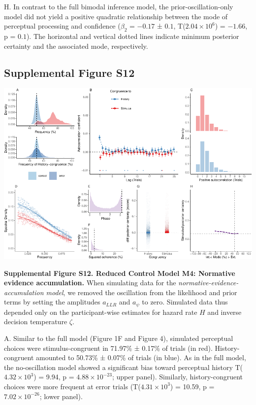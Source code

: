 \documentclass[
]{article}
\begin{document}
H. In contrast to the full bimodal inference model, the
prior-oscillation-only model did not yield a positive quadratic
relationship between the mode of perceptual processing and confidence
(\(\beta_2\) = \(-0.17\) ± \(0.1\),
T(\(\ensuremath{2.04\times 10^{6}}\)) = \(-1.66\), p = \(0.1\)). The
horizontal and vertical dotted lines indicate minimum posterior
certainty and the associated mode, respectively.

\newpage

\hypertarget{supplemental-figure-s12}{%
\subsection{Supplemental Figure S12}\label{supplemental-figure-s12}}

\includegraphics{modes_mouse_rev2_files/figure-latex/Supplemental_Figure_S12-1.pdf}

\textbf{Supplemental Figure S12. Reduced Control Model M4: Normative
evidence accumulation.} When simulating data for the
\emph{normative-evidence-accumulation model}, we removed the oscillation
from the likelihood and prior terms by setting the amplitudes
\(a_{LLR}\) and \(a_{\psi}\) to zero. Simulated data thus depended only
on the participant-wise estimates for hazard rate \(H\) and inverse
decision temperature \(\zeta\).

A. Similar to the full model (Figure 1F and Figure 4), simulated
perceptual choices were stimulus-congruent in 71.97\% ± 0.17\% of trials
(in red). History-congruent amounted to 50.73\% ± 0.07\% of trials (in
blue). As in the full model, the no-oscillation model showed a
significant bias toward perceptual history
T(\ensuremath{4.32\times 10^{3}}) = 9.94, p =
\(\ensuremath{4.88\times 10^{-23}}\); upper panel). Similarly,
history-congruent choices were more frequent at error trials
(T(\ensuremath{4.31\times 10^{3}}) = 10.59, p =
\(\ensuremath{7.02\times 10^{-26}}\); lower panel).
\end{document}

